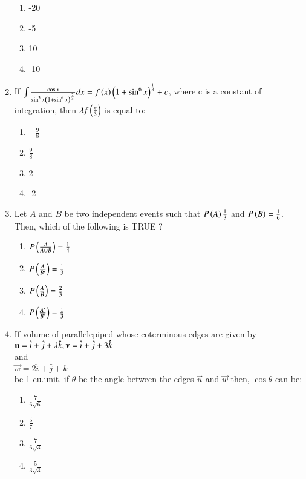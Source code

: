 \documentclass[journal,12pt,onecolumn]{IEEEtran}
\theoremstyle{remark}
\begin{document}
\begin{enumerate}
\begin{enumerate}
    \item -20
    \item -5
    \item 10
    \item -10
\end{enumerate}
\item If $\int \frac{\cos{x}}{\sin^3x\brak{1+\sin^{6}x}^\frac{2}{3}} dx = f\brak{x}\brak{1+\sin^6x}^\frac{1}{\lambda} + c $, where c is a constant of integration, then $\lambda f \brak{\frac{\pi}{3}}$ is equal to:
\begin{enumerate}
    \item $-\frac{9}{8}$
    \item $\frac{9}{8}$
    \item 2
    \item -2
\end{enumerate}
\item Let $A$ and $B$ be two independent events such that $P\brak{A} \frac{1}{3}$ and $P\brak{B} = \frac{1}{6}$. Then, which of the following is TRUE ?
\begin{enumerate}
    \item $P\brak{\frac{A}{A \cup B}} = \frac{1}{4}$
    \item $P\brak{\frac{A}{B^{\prime}}} = \frac{1}{3}$
    \item $P\brak{\frac{A}{B}}=\frac{2}{3}$
    \item $P\brak{\frac{A^{\prime}}{B^{\prime}}} = \frac{1}{3} $
\end{enumerate}
\item If volume of parallelepiped whose coterminous edges are given by
\\$\vec{u} = \hat{i} + \hat{j} + \lambda\hat{k},\\ \vec{v} = \hat{i} + \hat{j} + 3\hat{k}$ \\ and \\ $ \vec{w} = 2\hat{i} + \hat{j} + \hat{k}$ \\be 1 cu.unit. if $\theta$ be the angle between the edges $\vec{u}$ and $\vec{w}$ then, $\cos\theta$ can be:
\begin{enumerate}
    \item $\frac{7}{6\sqrt{6}}$
    \item $\frac{5}{7}$
    \item $\frac{7}{6\sqrt{3}}$
    \item $\frac{5}{3\sqrt{3}}$
\end{enumerate}

\end{enumerate}
\end{document}

